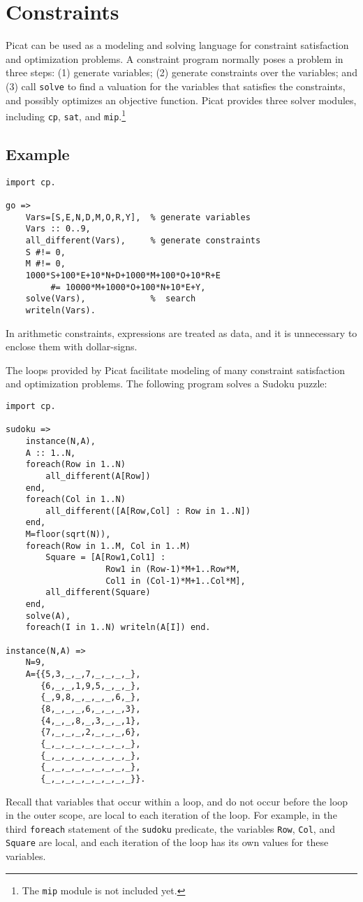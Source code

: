 \section{\label{section:Constraints}Constraints}
Picat can be used as a modeling and solving language for constraint satisfaction and optimization problems.  A constraint program normally poses a problem in three steps: (1) generate variables; (2) generate constraints over the variables; and (3) call \texttt{solve} to find a valuation for the variables that satisfies the constraints, and possibly optimizes an objective function. Picat provides three solver modules, including \texttt{cp}, \texttt{sat}, and \texttt{mip}.\footnote{The \texttt{mip} module is not included yet.}

\subsection*{Example}
\begin{verbatim}
import cp.

go => 
    Vars=[S,E,N,D,M,O,R,Y],  % generate variables
    Vars :: 0..9,
    all_different(Vars),     % generate constraints
    S #!= 0,
    M #!= 0,
    1000*S+100*E+10*N+D+1000*M+100*O+10*R+E 
         #= 10000*M+1000*O+100*N+10*E+Y,
    solve(Vars),             %  search
    writeln(Vars).
\end{verbatim}
In arithmetic constraints, expressions are treated as data, and it is unnecessary to enclose them with dollar-signs.

The loops provided by Picat facilitate modeling of many constraint satisfaction and optimization problems. The following program solves a Sudoku puzzle:
\begin{verbatim}
import cp.

sudoku =>
    instance(N,A),
    A :: 1..N,
    foreach(Row in 1..N)
        all_different(A[Row])
    end,
    foreach(Col in 1..N)
        all_different([A[Row,Col] : Row in 1..N])
    end,
    M=floor(sqrt(N)),
    foreach(Row in 1..M, Col in 1..M) 
        Square = [A[Row1,Col1] : 
                    Row1 in (Row-1)*M+1..Row*M, 
                    Col1 in (Col-1)*M+1..Col*M],
        all_different(Square)
    end,
    solve(A),
    foreach(I in 1..N) writeln(A[I]) end.

instance(N,A) =>
    N=9,
    A={{5,3,_,_,7,_,_,_,_},
       {6,_,_,1,9,5,_,_,_},
       {_,9,8,_,_,_,_,6,_},
       {8,_,_,_,6,_,_,_,3},
       {4,_,_,8,_,3,_,_,1},
       {7,_,_,_,2,_,_,_,6},
       {_,_,_,_,_,_,_,_,_},
       {_,_,_,_,_,_,_,_,_},
       {_,_,_,_,_,_,_,_,_},
       {_,_,_,_,_,_,_,_,_}}.
\end{verbatim}
Recall that variables that occur within a loop, and do not occur before the loop in the outer scope, are local to each iteration of the loop. For example, in the third \texttt{foreach} statement of the \texttt{sudoku} predicate, the variables \texttt{Row}, \texttt{Col}, and \texttt{Square} are local, and each iteration of the loop has its own values for these variables.


